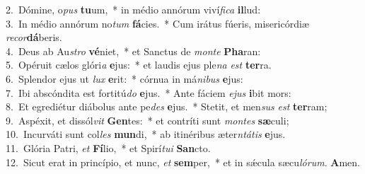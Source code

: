 {2.~}Dómine, o\textit{pus} \textbf{tu}um,~* in médio annórum viví\textit{fi}\textit{ca} \textbf{il}lud:\\
{3.~}In médio annórum no\textit{tum} \textbf{fá}cies.~* Cum irátus fúeris, misericórdiæ \textit{re}\textit{cor}\textbf{dá}beris.\\
{4.~}Deus ab Au\textit{stro} \textbf{vé}niet,~* et Sanctus de \textit{mon}\textit{te} \textbf{Pha}ran:\\
{5.~}Opéruit cælos glóri\textit{a} \textbf{e}jus:~* et laudis ejus ple\textit{na} \textit{est} \textbf{ter}ra.\\
{6.~}Splendor ejus ut \textit{lux} \textbf{e}rit:~* córnua in má\textit{ni}\textit{bus} \textbf{e}jus:\\
{7.~}Ibi abscóndita est fortitú\textit{do} \textbf{e}jus.~* Ante fáciem \textit{e}\textit{jus} \textbf{i}bit mors:\\
{8.~}Et egrediétur diábolus ante pe\textit{des} \textbf{e}jus.~* Stetit, et men\textit{sus} \textit{est} \textbf{ter}ram;\\
{9.~}Aspéxit, et dissól\textit{vit} \textbf{Gen}tes:~* et contríti sunt \textit{mon}\textit{tes} \textbf{sæ}culi;\\
{10.~}Incurváti sunt col\textit{les} \textbf{mun}di,~* ab itinéribus æter\textit{ntá}\textit{tis} \textbf{e}jus.\\
{11.~}Glória Patri, \textit{et} \textbf{Fí}lio,~* et Spirí\textit{tu}\textit{i} \textbf{San}cto.\\
{12.~}Sicut erat in princípio, et nunc, \textit{et} \textbf{sem}per,~* et in sǽcula sæcu\textit{ló}\textit{rum}. \textbf{A}men.\\
